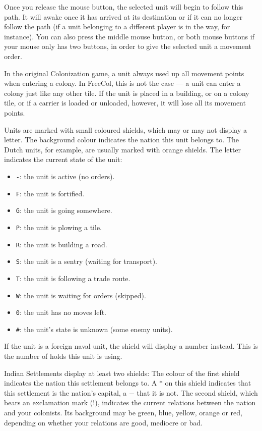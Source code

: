 \documentclass[12pt]{article}
\begin{document}
Once you release the mouse button, the selected unit will begin to
follow this path. It will awake once it has arrived at its destination
or if it can no longer follow the path (if a unit belonging to a
different player is in the way, for instance). You can also press the
middle mouse button, or both mouse buttons if your mouse only has two
buttons, in order to give the selected unit a movement order.

In the original Colonization game, a unit always used up all movement
points when entering a colony. In FreeCol, this is not the case --- a
unit can enter a colony just like any other tile. If the unit is
placed in a building, or on a colony tile, or if a carrier is loaded
or unloaded, however, it will lose all its movement points.

Units are marked with small coloured shields, which may or may not
display a letter. The background colour indicates the nation this unit
belongs to. The Dutch units, for example, are usually marked with
orange shields. The letter indicates the current state of the unit:

\pagebreak[2]
\begin{itemize}
\item\verb$-$: the unit is active (no orders).
\item\verb$F$: the unit is fortified.
\item\verb$G$: the unit is going somewhere.
\item\verb$P$: the unit is plowing a tile.
\item\verb$R$: the unit is building a road.
\item\verb$S$: the unit is a sentry (waiting for transport).
\item\verb$T$: the unit is following a trade route.
\item\verb$W$: the unit is waiting for orders (skipped).
\item\verb$0$: the unit has no moves left.
\item\verb$#$: the unit's state is unknown (some enemy units).
\end{itemize}

If the unit is a foreign naval unit, the shield will display a number
instead. This is the number of holds this unit is using.

Indian Settlements display at least two shields: The colour of the
first shield indicates the nation this settlement belongs to. A $*$ on
this shield indicates that this settlement is the nation's capital, a
$-$ that it is not. The second shield, which bears an exclamation mark
($!$), indicates the current relations between the nation and your
colonists. Its background may be green, blue, yellow, orange or red,
depending on whether your relations are good, mediocre or bad.
\end{document}
